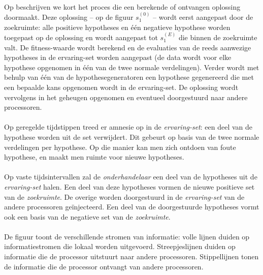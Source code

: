 \paragraph{}
Op  beschrijven we kort het proces die een berekende of ontvangen oplossing doormaakt. Deze oplossing -- op de figuur $s_1^{(0)}$ -- wordt eerst aangepast door de zoekruimte: alle positieve hypotheses en \'e\'en negatieve hypothese worden toegepast op de oplossing en wordt aangepast tot $s_1^{(E)}$ die binnen de zoekruimte valt. De fitness-waarde wordt berekend en de evaluaties van de reeds aanwezige hypotheses in de ervaring-set worden aangepast (de data wordt voor elke hypothese opgenomen in \'e\'en van de twee normale verdelingen). Verder wordt met behulp van \'e\'en van de hypothesegeneratoren  een hypothese gegenereerd die met een bepaalde kans opgenomen wordt in de ervaring-set. De oplossing wordt vervolgens in het geheugen opgenomen en eventueel doorgestuurd naar andere processoren.

\paragraph{}
Op geregelde tijdstippen treed er amnesie op in de \emph{ervaring-set}: een deel van de hypothese worden uit de set verwijdert. Dit gebeurt op basis van de twee normale verdelingen per hypothese. Op die manier kan men zich ontdoen van foute hypothese, en maakt men ruimte voor nieuwe hypotheses.

\paragraph{}
Op vaste tijdsintervallen zal de \emph{onderhandelaar} een deel van de hypotheses uit de \emph{ervaring-set} halen. Een deel van deze hypotheses vormen de nieuwe positieve set van de \emph{zoekruimte}. De overige worden doorgestuurd in de \emph{ervaring-set} van de andere processoren ge\"injecteerd. Een deel van de doorgestuurde hypotheses vormt ook een basis van de negatieve set van de \emph{zoekruimte}.

\paragraph{}
De figuur toont de verschillende stromen van informatie: volle lijnen duiden op informatiestromen die lokaal worden uitgevoerd. Streepjeslijnen duiden op informatie die de processor uitstuurt naar andere processoren. Stippellijnen tonen de informatie die de processor ontvangt van andere processoren.

